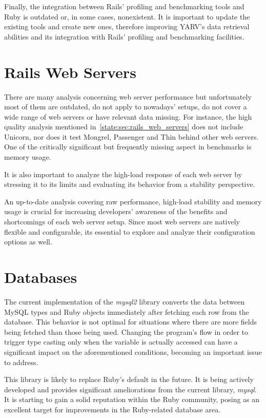 Finally, the integration between Rails' profiling and benchmarking tools and Ruby is outdated or, in some cases, nonexistent. It is important to update the existing tools and create new ones, therefore improving YARV's data retrieval abilities and its integration with Rails' profiling and benchmarking facilities.

\section{Rails Web Servers}
There are many analysis concerning web server performance but unfortunately most of them are outdated, do not apply to nowadays' setups, do not cover a wide range of web servers or have relevant data missing. For instance, the high quality analysis mentioned in~\ref{state:sec:rails_web_servers} does not include Unicorn, nor does it test Mongrel, Passenger and Thin behind other web servers. One of the critically significant but frequently missing aspect in benchmarks is memory usage.

It is also important to analyze the high-load response of each web server by stressing it to its limits and evaluating its behavior from a stability perspective. 

An up-to-date analysis covering raw performance, high-load stability and memory usage is crucial for increasing developers' awareness of the benefits and shortcomings of each web server setup. Since most web servers are natively flexible and configurable, its essential to explore and analyze their configuration options as well.

\section{Databases}
The current implementation of the \textit{mysql2} library converts the data between MySQL types and Ruby objects immediately after fetching each row from the database. This behavior is not optimal for situations where there are more fields being fetched than those being used. Changing the program's flow in order to trigger type casting only when the variable is actually accessed can have a significant impact on the aforementioned conditions, becoming an important issue to address.

This library is likely to replace Ruby's default in the future. It is being actively developed and provides significant ameliorations from the current library, \textit{mysql}. It is starting to gain a solid reputation within the Ruby community, posing as an excellent target for improvements in the Ruby-related database area.

